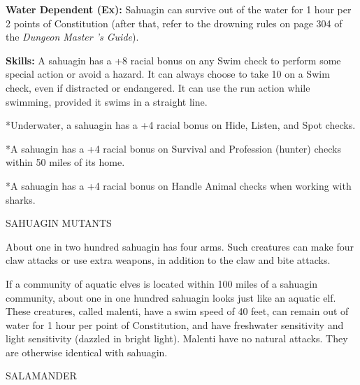 \documentclass{article}
\begin{document}
\textbf{Water Dependent (Ex):} Sahuagin can survive out of the water for 1 hour 
per 2 points of Constitution (after that, refer to the drowning rules on page 304 
of the \textit{Dungeon Master 's Guide}).

\textbf{Skills:} A sahuagin has a +8 racial bonus on any Swim check to perform 
some special action or avoid a hazard. It can always choose to take 10 on a Swim 
check, even if distracted or endangered. It can use the run action while swimming, 
provided it swims in a straight line. 

*Underwater, a sahuagin has a +4 racial bonus on Hide, Listen, and Spot checks.

*A sahuagin has a +4 racial bonus on Survival and Profession (hunter) checks within 
50 miles of its home.

*A sahuagin has a +4 racial bonus on Handle Animal checks when working with sharks.

SAHUAGIN MUTANTS

About one in two hundred sahuagin has four arms. Such creatures can make four claw 
attacks or use extra weapons, in addition to the claw and bite attacks.

If a community of aquatic elves is located within 100 miles of a sahuagin community, 
about one in one hundred sahuagin looks just like an aquatic elf. These creatures, 
called malenti, have a swim speed of 40 feet, can remain out of water for 1 hour 
per point of Constitution, and have freshwater sensitivity and light sensitivity 
(dazzled in bright light). Malenti have no natural attacks. They are otherwise 
identical with sahuagin.

\vspace{12pt}
{\LARGE{}SALAMANDER}
\end{document}
